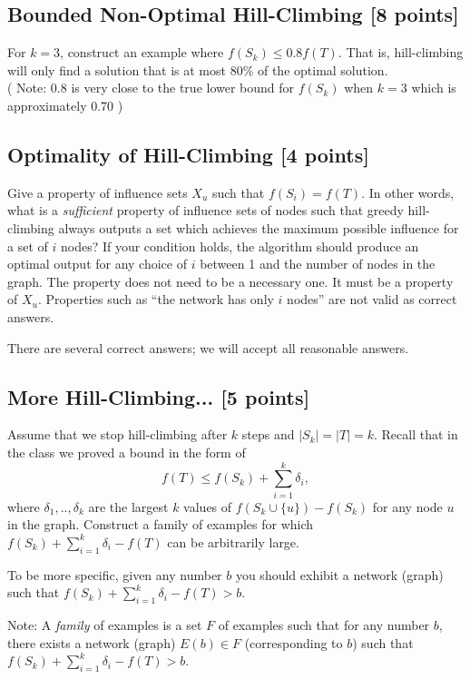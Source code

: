 \subsection{Bounded Non-Optimal Hill-Climbing [8 points]} 


For $k= 3$, construct an example where  $f(S_k) \leq 0.8 f(T)$. That is, hill-climbing will only find a solution that is at most 80\% of the optimal solution.\\
( Note: 0.8 is very close to the true lower bound for $f(S_k)$ when $k=3$ which is approximately 0.70 )

\subsection{Optimality of Hill-Climbing [4 points]} Give a property of influence sets $X_u$ such that $f(S_i) = f(T)$.  In other words, what is a \emph{sufficient} property of influence sets of nodes such that greedy hill-climbing always outputs a set which achieves the maximum possible influence for a set of $i$ nodes? If your condition holds, the algorithm should produce an optimal output for any choice of $i$ between 1 and the number of nodes in the graph. The property does not need to be a necessary one. It must be a property of $X_u$. Properties such as ``the network has only $i$ nodes'' are not valid as correct answers.

There are several correct answers; we will accept all reasonable answers.\\

\subsection{More Hill-Climbing... [5 points]}

Assume that we stop hill-climbing after $k$ steps and $|S_k| = |T| = k$. Recall that in the class we proved a bound in the form of
\begin{equation}
f(T) \leq f(S_k) + \sum_{i=1}^k \delta_i,
\end{equation}
where $ \delta_1, .., \delta_k $ are the largest $k$ values of $f(S_k \cup \{u\}) - f(S_k)$ for any node $u$ in the graph. Construct a family of examples for which $f(S_k) + \sum_{i=1}^k \delta_i - f(T)$ can be arbitrarily large.

To be more specific, given any number $b$ you should exhibit a network (graph) such that $f(S_k) + \sum_{i=1}^k \delta_i - f(T)>b$.

Note: A {\em family} of examples is a set $F$ of examples such that for any number $b$, there exists a network (graph) $E(b) \in F$ (corresponding to $b$) such that $f(S_k) + \sum_{i=1}^k \delta_i - f(T)>b$.


